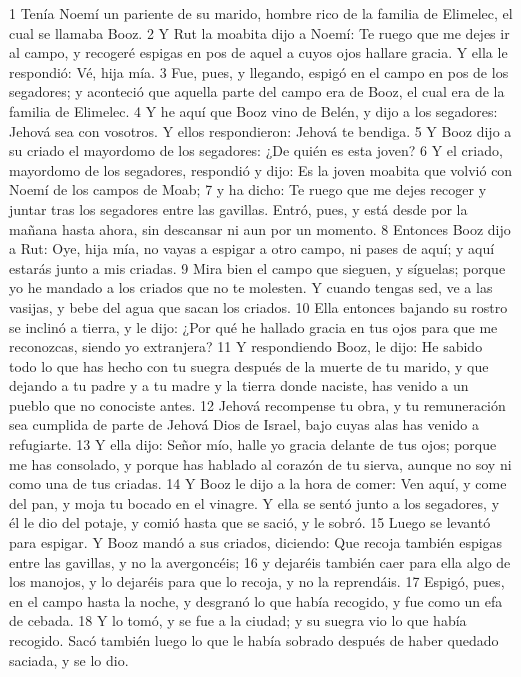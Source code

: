 1 Tenía Noemí un pariente de su marido, hombre rico de la familia de Elimelec, el cual se llamaba Booz.
2 Y Rut la moabita dijo a Noemí: Te ruego que me dejes ir al campo, y recogeré espigas en pos de aquel a cuyos ojos hallare gracia. Y ella le respondió: Vé, hija mía.
3 Fue, pues, y llegando, espigó en el campo en pos de los segadores; y aconteció que aquella parte del campo era de Booz, el cual era de la familia de Elimelec.
4 Y he aquí que Booz vino de Belén, y dijo a los segadores: Jehová sea con vosotros. Y ellos respondieron: Jehová te bendiga.
5 Y Booz dijo a su criado el mayordomo de los segadores: ¿De quién es esta joven?
6 Y el criado, mayordomo de los segadores, respondió y dijo: Es la joven moabita que volvió con Noemí de los campos de Moab;
7 y ha dicho: Te ruego que me dejes recoger y juntar tras los segadores entre las gavillas. Entró, pues, y está desde por la mañana hasta ahora, sin descansar ni aun por un momento.
8 Entonces Booz dijo a Rut: Oye, hija mía, no vayas a espigar a otro campo, ni pases de aquí; y aquí estarás junto a mis criadas.
9 Mira bien el campo que sieguen, y síguelas; porque yo he mandado a los criados que no te molesten. Y cuando tengas sed, ve a las vasijas, y bebe del agua que sacan los criados.
10 Ella entonces bajando su rostro se inclinó a tierra, y le dijo: ¿Por qué he hallado gracia en tus ojos para que me reconozcas, siendo yo extranjera?
11 Y respondiendo Booz, le dijo: He sabido todo lo que has hecho con tu suegra después de la muerte de tu marido, y que dejando a tu padre y a tu madre y la tierra donde naciste, has venido a un pueblo que no conociste antes.
12 Jehová recompense tu obra, y tu remuneración sea cumplida de parte de Jehová Dios de Israel, bajo cuyas alas has venido a refugiarte.
13 Y ella dijo: Señor mío, halle yo gracia delante de tus ojos; porque me has consolado, y porque has hablado al corazón de tu sierva, aunque no soy ni como una de tus criadas.
14 Y Booz le dijo a la hora de comer: Ven aquí, y come del pan, y moja tu bocado en el vinagre. Y ella se sentó junto a los segadores, y él le dio del potaje, y comió hasta que se sació, y le sobró.
15 Luego se levantó para espigar. Y Booz mandó a sus criados, diciendo: Que recoja también espigas entre las gavillas, y no la avergoncéis;
16 y dejaréis también caer para ella algo de los manojos, y lo dejaréis para que lo recoja, y no la reprendáis.
17 Espigó, pues, en el campo hasta la noche, y desgranó lo que había recogido, y fue como un efa   de cebada.
18 Y lo tomó, y se fue a la ciudad; y su suegra vio lo que había recogido. Sacó también luego lo que le había sobrado después de haber quedado saciada, y se lo dio.
